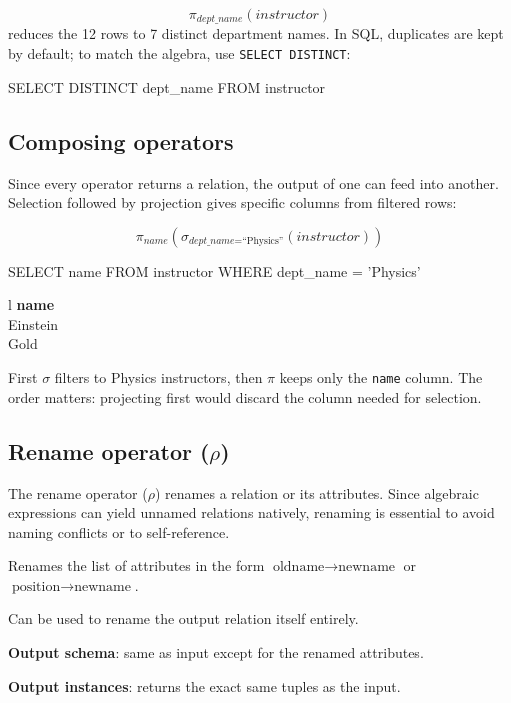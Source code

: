 \documentclass[../../dis.tex]{subfiles}
\begin{document}
\[ \pi_{\textit{dept\_name}}(\textit{instructor}) \]
reduces the 12 rows to 7 distinct department names. In SQL, duplicates are kept by default; to match the algebra, use \lstinline[style=SQLStyle]{SELECT DISTINCT}:
\begin{sql}
    SELECT DISTINCT dept_name FROM instructor
\end{sql}

\subsection{Composing operators}
Since every operator returns a relation, the output of one can feed into another. Selection followed by projection gives specific columns from filtered rows:

\[ \pi_{\textit{name}}\!\left(\sigma_{\textit{dept\_name} = \text{``Physics''}}(\textit{instructor})\right) \]

\begin{sql}
    SELECT name FROM instructor WHERE dept_name = 'Physics'
\end{sql}

\begin{dbtable}{}{l}
\textbf{name} \\ \hline
Einstein \\ \hline
Gold \\
\end{dbtable}

First $\sigma$ filters to Physics instructors, then $\pi$ keeps only the \texttt{name} column. The order matters: projecting first would discard the column needed for selection.

\newpage
\subsection{Rename operator ($\rho$)}
The rename operator ($\rho$) renames a relation or its attributes. Since algebraic expressions can yield unnamed relations natively, renaming is essential to avoid naming conflicts or to self-reference.

\begin{dashlist}
    \item Renames the list of attributes in the form $\text{oldname} \rightarrow \text{newname}$ or $\text{position} \rightarrow \text{newname}$.
    \item Can be used to rename the output relation itself entirely.
    \item \textbf{Output schema}: same as input except for the renamed attributes.
    \item \textbf{Output instances}: returns the exact same tuples as the input.
\end{dashlist}
\end{document}
